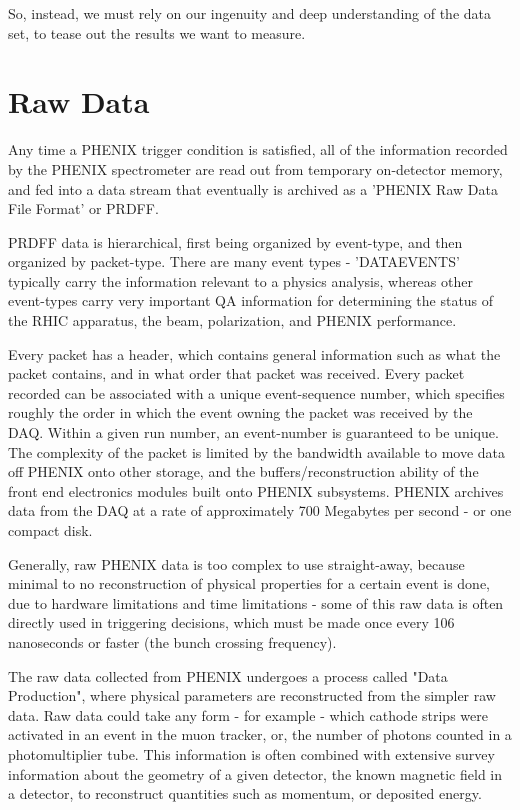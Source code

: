 So, instead, we must rely on our ingenuity and deep understanding of the data
set, to tease out the results we want to measure.

\section{Raw Data}

Any time a PHENIX trigger condition is satisfied, all of the information
recorded by the PHENIX spectrometer are read out from temporary on-detector
memory, and fed into a data stream that eventually is archived as a 'PHENIX Raw
Data File Format' or PRDFF. 

PRDFF data is hierarchical, first being organized by event-type, and
then organized by packet-type.  There are many event types - 'DATAEVENTS'
typically carry the information relevant to a physics analysis, whereas other
event-types carry very important QA information for determining the status of
the RHIC apparatus, the beam, polarization, and PHENIX performance.

Every packet has a header, which contains general information such as what the
packet contains, and in what order that packet was received. Every packet
recorded can be associated with a unique event-sequence number, which specifies
roughly the order in which the event owning the packet was received by the DAQ.
Within a given run number, an event-number is guaranteed to be unique. The
complexity of the packet is limited by the bandwidth available to move data off
PHENIX onto other storage, and the buffers/reconstruction ability of the front
end electronics modules built onto PHENIX subsystems. PHENIX archives data from
the DAQ at a rate of approximately 700 Megabytes per second - or one compact
disk.

Generally, raw PHENIX data is too complex to use straight-away, because minimal
to no reconstruction of physical properties for a certain event is done, due to
hardware limitations and time limitations - some of this raw data is often
directly used in triggering decisions, which must be made once every 106
nanoseconds or faster (the bunch crossing frequency).

The raw data collected from PHENIX undergoes a process called "Data Production",
where physical parameters are reconstructed from the simpler raw data. Raw data
could take any form - for example - which cathode strips were activated in an
event in the muon tracker, or, the number of photons counted in a
photomultiplier tube. This information is often combined with extensive survey
information about the geometry of a given detector, the known magnetic field in
a detector, to reconstruct quantities such as momentum, or deposited energy.

